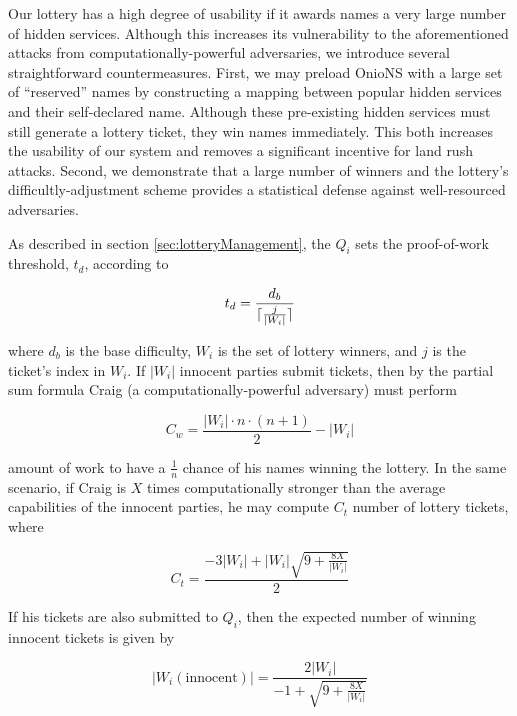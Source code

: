 \documentclass[USenglish,oneside,twocolumn]{article}
\DeclarePairedDelimiter{\ceil}{\lceil}{\rceil}
\newcommand*\nWinners{\left\vert{W_{i}}\right\vert}
\begin{document}
Our lottery has a high degree of usability if it awards names a very large number of hidden services. Although this increases its vulnerability to the aforementioned attacks from computationally-powerful adversaries, we introduce several straightforward countermeasures. First, we may preload OnioNS with a large set of ``reserved'' names by constructing a mapping between popular hidden services and their self-declared name. Although these pre-existing hidden services must still generate a lottery ticket, they win names immediately. This both increases the usability of our system and removes a significant incentive for land rush attacks. Second, we demonstrate that a large number of winners and the lottery's difficultly-adjustment scheme provides a statistical defense against well-resourced adversaries.

As described in section \ref{sec:lotteryManagement}, the $ Q_{i} $ sets the proof-of-work threshold, $ t_{d} $, according to 

\begin{equation}
	t_{d} = \frac{d_{b}}{\ceil{\frac{j}{\nWinners}}}
\end{equation}

\noindent where $ d_{b} $ is the base difficulty, $ W_{i} $ is the set of lottery winners, and $ j $ is the ticket's index in $ W_{i} $. If $ \left\vert{W_{i}}\right\vert $ innocent parties submit tickets, then by the partial sum formula Craig (a computationally-powerful adversary) must perform 

\begin{equation}
	C_{w} = \frac{\nWinners \cdot n \cdot  (n+1)}{2} - \nWinners
\end{equation}

\noindent amount of work to have a $ \frac{1}{n} $ chance of his names winning the lottery. In the same scenario, if Craig is $ X $ times computationally stronger than the average capabilities of the innocent parties, he may compute $ C_{t} $ number of lottery tickets, where

\begin{equation}
	C_{t} = \frac{-3 \nWinners + \nWinners \sqrt{9 + \frac{8X}{\nWinners}}}{2}
\end{equation}

If his tickets are also submitted to $ Q_{i} $, then the expected number of winning innocent tickets is given by

\begin{equation}
	\left\vert{W_{i}(\mathrm{innocent})}\right\vert = \frac{2 \nWinners}{-1 + \sqrt{9 + \frac{8X}{\nWinners}}}
	\label{eq:expInnocentWinners}
\end{equation}
\end{document}

